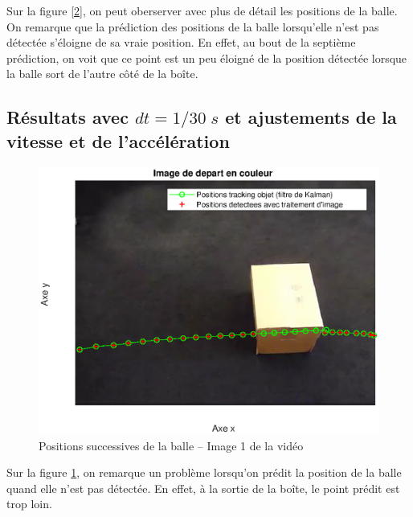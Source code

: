 Sur la figure \ref{2}, on peut oberserver avec plus de détail les positions de la balle. On remarque que la prédiction des positions de la balle lorsqu'elle n'est pas détectée s'éloigne de sa vraie position. En effet, au bout de la septième prédiction, on voit que ce point est un peu éloigné de la position détectée lorsque la balle sort de l'autre côté de la boîte.

\subsection{Résultats avec $ dt = 1/30 \; s $ et ajustements de la vitesse et de l'accélération}

\begin{figure}[H]
\caption{Positions successives de la balle \--- Image 1 de la vidéo}
\centerline{\includegraphics[width=20cm]{Images/Resultats/ImageDeDepartEnCourleur2}}
\label{3}
\end{figure}

Sur la figure \ref{3}, on remarque un problème lorsqu'on prédit la position de la balle quand elle n'est pas détectée. En effet, à la sortie de la boîte, le point prédit est trop loin.

